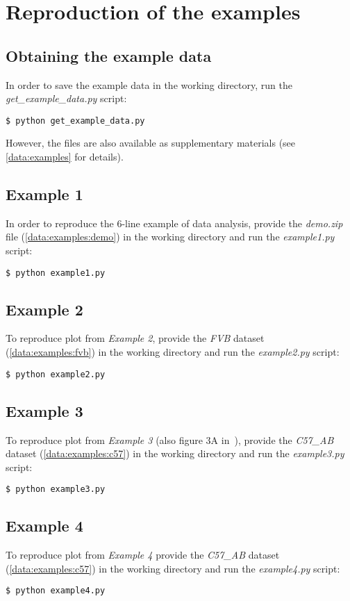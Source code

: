 \section{Reproduction of the examples}
\label{examples}

\subsection{Obtaining the example data}
\label{examples:data}
In order to save the example data in the working directory, run the
\emph{get\_example\_data.py} script:
\begin{verbatim}
$ python get_example_data.py
\end{verbatim}

However, the files are also available as supplementary materials (see
\ref{data:examples} for details).

\subsection{Example 1}
\label{examples:1}
In order to reproduce the 6-line example of data analysis, provide the
\emph{demo.zip} file (\ref{data:examples:demo}) in the working directory and
run the \emph{example1.py} script:
\begin{verbatim}
$ python example1.py
\end{verbatim}


\subsection{Example 2}
\label{examples:2}
To reproduce plot from \emph{Example 2},
provide the \emph{FVB} dataset (\ref{data:examples:fvb}) in the working
directory and run the \emph{example2.py} script:
\begin{verbatim}
$ python example2.py
\end{verbatim}


\subsection{Example 3}
\label{examples:3}
To reproduce plot from \emph{Example 3} (also figure 3A in~\cite{Puscian:2014cu}),
provide the \emph{C57\_AB} dataset (\ref{data:examples:c57}) in the working
directory and run the \emph{example3.py} script:
\begin{verbatim}
$ python example3.py
\end{verbatim}


\subsection{Example 4}
\label{examples:4}
To reproduce plot from \emph{Example 4} provide the \emph{C57\_AB}
dataset (\ref{data:examples:c57}) in the working directory and run the
\emph{example4.py} script:
\begin{verbatim}
$ python example4.py
\end{verbatim}


